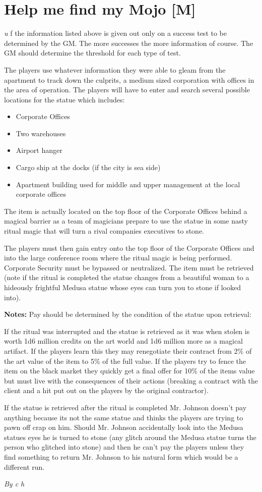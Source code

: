 \documentclass[letterpaper,twocolumn,10.5pt]{article}
\newenvironment{scenario}[6]
	{
		\section{#1 {\small[#2]}}
		\textit{#3}
		\def\TMPSCENARIO{#4 #5}
	}
	{\small\textit{By \TMPSCENARIO}}
\newcommand{\notes}{\textbf{Notes: }}
\begin{document}
\begin{scenario}{Help me find my Mojo}
Much of the information listed above is given out only on a success test to be determined by the GM. The more successes the more information of course. The GM should determine the threshold for each type of test.

The players use whatever information they were able to gleam from the apartment to track down the culprits, a medium sized corporation with offices in the area of operation. The players will have to enter and search several possible locations for the statue which includes:

\begin{itemize}
\item    Corporate Offices
\item    Two warehouses
\item    Airport hanger
\item    Cargo ship at the docks (if the city is sea side)
\item    Apartment building used for middle and upper management at the local corporate offices
\end{itemize}


The item is actually located on the top floor of the Corporate Offices behind a magical barrier as a team of magicians prepare to use the statue in some nasty ritual magic that will turn a rival companies executives to stone.

The players must then gain entry onto the top floor of the Corporate Offices and into the large conference room where the ritual magic is being performed. Corporate Security must be bypassed or neutralized. The item must be retrieved (note if the ritual is completed the statue changes from a beautiful woman to a hideously frightful Medusa statue whose eyes can turn you to stone if looked into).

\notes
 Pay should be determined by the condition of the statue upon retrieval:

If the ritual was interrupted and the statue is retrieved as it was when stolen is worth 1d6 million credits on the art world and 1d6 million more as a magical artifact. If the players learn this they may renegotiate their contract from 2\% of the art value of the item to 5\% of the full value. If the players try to fence the item on the black market they quickly get a final offer for 10\% of the items value but must live with the consequences of their actions (breaking a contract with the client and a hit put out on the players by the original contractor).

If the statue is retrieved after the ritual is completed Mr. Johnson doesn't pay anything because its not the same statue and thinks the players are trying to pawn off crap on him. Should Mr. Johnson accidentally look into the Medusa statues eyes he is turned to stone (any glitch around the Medusa statue turns the person who glitched into stone) and then he can't pay the players unless they find something to return Mr. Johnson to his natural form which would be a different run.

\end{scenario}
\end{document}
